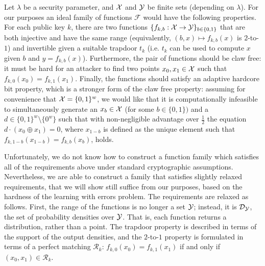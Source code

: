 
Let $\lambda$ be a security parameter, and $\mathcal{X}$ and $\mathcal{Y}$ be finite sets (depending on $\lambda$). For our purposes an ideal family of functions $\mathcal{F}$ would have the following properties. For each public key $k$, there are two functions $ \{f_{k,b}:\mathcal{X}\rightarrow \mathcal{Y}\}_{b\in\{0,1\}}$ that are both injective and have the same range (equivalently, $(b,x)\mapsto f_{k,b}(x)$ is $2$-to-$1$) and invertible given a suitable trapdoor $t_k$ (i.e. $t_k$ can be used to compute $x$ given $b$ and $y=f_{k,b}(x)$). Furthermore, the pair of functions should be claw free: it must be hard for an attacker to find two points $x_0,x_1\in\mathcal{X}$ such that $f_{k,0}(x_0) = f_{k,1}(x_1)$. Finally, the functions should satisfy an adaptive hardcore bit property, which is a stronger form of the claw free property: assuming for convenience that $\mathcal{X}= \{0,1\}^w$, we would like that it is computationally infeasible to simultaneously generate an $x_b\in\mathcal{X}$ (for some $b\in\{0,1\})$ and a $d\in \{0,1\}^w\setminus \{0^w\}$ such that with non-negligible advantage over $\frac{1}{2}$ the equation $d\cdot (x_0\oplus x_1)=0$, where $x_{1-b}$ is defined as the unique element such that $f_{k,1-b}(x_{1-b})=f_{k,b}(x_b)$, holds.  


Unfortunately, we do not know how to construct a function family which satisfies all of the requirements above under standard cryptographic assumptions. Nevertheless, we are able to construct a family that satisfies slightly relaxed requirements, that we will show still suffice from our purposes, based on the hardness of the learning with errors problem. The requirements are relaxed as follows. First, the range of the functions is no longer a set $\mathcal{Y}$; instead, it is  $\mathcal{D}_{\mathcal{Y}}$, the set of probability densities over $\mathcal{Y}$. That is, each function returns a distribution, rather than a point. The trapdoor property is described in terms of the support of the output densities, and the $2$-to-$1$ property is formulated in terms of a perfect matching $\mathcal{R}_k$: $f_{k,0}(x_0) = f_{k,1}(x_1)$ if and only if $(x_0,x_1)\in\mathcal{R}_k$. 

